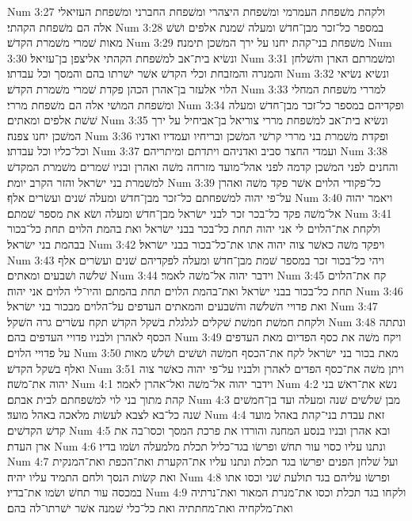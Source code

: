 Num 3:27  ולקהת משׁפחת העמרמי ומשׁפחת היצהרי ומשׁפחת החברני ומשׁפחת העזיאלי אלה הם משׁפחת הקהתי׃
Num 3:28  במספר כל־זכר מבן־חדשׁ ומעלה שׁמנת אלפים ושׁשׁ מאות שׁמרי משׁמרת הקדשׁ׃
Num 3:29  משׁפחת בני־קהת יחנו על ירך המשׁכן תימנה׃
Num 3:30  ונשׂיא בית־אב למשׁפחת הקהתי אליצפן בן־עזיאל׃
Num 3:31  ומשׁמרתם הארן והשׁלחן והמנרה והמזבחת וכלי הקדשׁ אשׁר ישׁרתו בהם והמסך וכל עבדתו׃
Num 3:32  ונשׂיא נשׂיאי הלוי אלעזר בן־אהרן הכהן פקדת שׁמרי משׁמרת הקדשׁ׃
Num 3:33  למררי משׁפחת המחלי ומשׁפחת המושׁי אלה הם משׁפחת מררי׃
Num 3:34  ופקדיהם במספר כל־זכר מבן־חדשׁ ומעלה שׁשׁת אלפים ומאתים׃
Num 3:35  ונשׂיא בית־אב למשׁפחת מררי צוריאל בן־אביחיל על ירך המשׁכן יחנו צפנה׃
Num 3:36  ופקדת משׁמרת בני מררי קרשׁי המשׁכן ובריחיו ועמדיו ואדניו וכל־כליו וכל עבדתו׃
Num 3:37  ועמדי החצר סביב ואדניהם ויתדתם ומיתריהם׃
Num 3:38  והחנים לפני המשׁכן קדמה לפני אהל־מועד מזרחה משׁה ואהרן ובניו שׁמרים משׁמרת המקדשׁ למשׁמרת בני ישׂראל והזר הקרב יומת׃
Num 3:39  כל־פקודי הלוים אשׁר פקד משׁה ואהרן על־פי יהוה למשׁפחתם כל־זכר מבן־חדשׁ ומעלה שׁנים ועשׂרים אלף׃
Num 3:40  ויאמר יהוה אל־משׁה פקד כל־בכר זכר לבני ישׂראל מבן־חדשׁ ומעלה ושׂא את מספר שׁמתם׃
Num 3:41  ולקחת את־הלוים לי אני יהוה תחת כל־בכר בבני ישׂראל ואת בהמת הלוים תחת כל־בכור בבהמת בני ישׂראל׃
Num 3:42  ויפקד משׁה כאשׁר צוה יהוה אתו את־כל־בכור בבני ישׂראל׃
Num 3:43  ויהי כל־בכור זכר במספר שׁמת מבן־חדשׁ ומעלה לפקדיהם שׁנים ועשׂרים אלף שׁלשׁה ושׁבעים ומאתים׃
Num 3:44  וידבר יהוה אל־משׁה לאמר׃
Num 3:45  קח את־הלוים תחת כל־בכור בבני ישׂראל ואת־בהמת הלוים תחת בהמתם והיו־לי הלוים אני יהוה׃
Num 3:46  ואת פדויי השׁלשׁה והשׁבעים והמאתים העדפים על־הלוים מבכור בני ישׂראל׃
Num 3:47  ולקחת חמשׁת חמשׁת שׁקלים לגלגלת בשׁקל הקדשׁ תקח עשׂרים גרה השׁקל׃
Num 3:48  ונתתה הכסף לאהרן ולבניו פדויי העדפים בהם׃
Num 3:49  ויקח משׁה את כסף הפדיום מאת העדפים על פדויי הלוים׃
Num 3:50  מאת בכור בני ישׂראל לקח את־הכסף חמשׁה ושׁשׁים ושׁלשׁ מאות ואלף בשׁקל הקדשׁ׃
Num 3:51  ויתן משׁה את־כסף הפדים לאהרן ולבניו על־פי יהוה כאשׁר צוה יהוה את־משׁה׃
Num 4:1  וידבר יהוה אל־משׁה ואל־אהרן לאמר׃
Num 4:2  נשׂא את־ראשׁ בני קהת מתוך בני לוי למשׁפחתם לבית אבתם׃
Num 4:3  מבן שׁלשׁים שׁנה ומעלה ועד בן־חמשׁים שׁנה כל־בא לצבא לעשׂות מלאכה באהל מועד׃
Num 4:4  זאת עבדת בני־קהת באהל מועד קדשׁ הקדשׁים׃
Num 4:5  ובא אהרן ובניו בנסע המחנה והורדו את פרכת המסך וכסו־בה את ארן העדת׃
Num 4:6  ונתנו עליו כסוי עור תחשׁ ופרשׂו בגד־כליל תכלת מלמעלה ושׂמו בדיו׃
Num 4:7  ועל שׁלחן הפנים יפרשׂו בגד תכלת ונתנו עליו את־הקערת ואת־הכפת ואת־המנקית ואת קשׂות הנסך ולחם התמיד עליו יהיה׃
Num 4:8  ופרשׂו עליהם בגד תולעת שׁני וכסו אתו במכסה עור תחשׁ ושׂמו את־בדיו׃
Num 4:9  ולקחו בגד תכלת וכסו את־מנרת המאור ואת־נרתיה ואת־מלקחיה ואת־מחתתיה ואת כל־כלי שׁמנה אשׁר ישׁרתו־לה בהם׃
